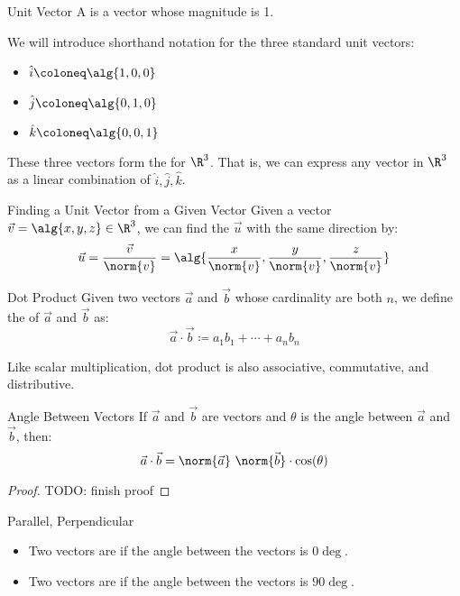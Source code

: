 \documentclass[math]{amznotes}
\begin{document}
\begin{dfnbox}{Unit Vector}{}
    A  is a vector whose magnitude is 1.
\end{dfnbox}

We will introduce shorthand notation for the three standard unit vectors:
\begin{itemize}
    \item $\hat{i} \coloneq \alg{1,0,0}$
    \item $\hat{j} \coloneq \alg{0,1,0}$
    \item $\hat{k} \coloneq \alg{0,0,1}$
\end{itemize}
These three vectors form the  for $\R^3$. That is, we can express any vector in $\R^3$ as a linear combination of $\hat{i}, \hat{j}, \hat{k}$.

\begin{tecbox}{Finding a Unit Vector from a Given Vector}{}
    Given a vector $\vec{v} = \alg{x, y, z} \in \R^3$, we can find the  $\vec{u}$ with the same direction by:
    \[ \vec{u} = \frac{\vec{v}}{\norm{v}} = \alg{\frac{x}{\norm{v}}, \frac{y}{\norm{v}}, \frac{z}{\norm{v}}} \]
\end{tecbox}

\begin{dfnbox}{Dot Product}{}
    Given two vectors $\vec{a}$ and $\vec{b}$ whose cardinality are both $n$, we define the  of $\vec{a}$ and $\vec{b}$ as:
    \[ \vec{a} \cdot \vec{b} \coloneq a_1b_1 + \cdots + a_nb_n \]
\end{dfnbox}

Like scalar multiplication, dot product is also associative, commutative, and distributive.

\begin{thmbox}{Angle Between Vectors}{}
    If $\vec{a}$ and $\vec{b}$ are vectors and $\theta$ is the angle between $\vec{a}$ and $\vec{b}$, then:
    \[ \vec{a} \cdot \vec{b} = \norm{\vec{a}} \ \norm{\vec{b}} \cdot \cos(\theta) \]
    \tcblower
    \begin{proof}
        TODO: finish proof
    \end{proof}
\end{thmbox}

\begin{dfnbox}{Parallel, Perpendicular}{}
    \begin{itemize}[noitemsep]
        \item Two vectors are  if the angle between the vectors is $0\deg$.
        \item Two vectors are  if the angle between the vectors is $90\deg$.
    \end{itemize}
\end{dfnbox}
\end{document}
